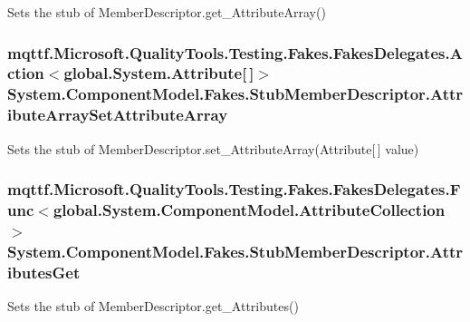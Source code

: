 Sets the stub of Member\-Descriptor.\-get\-\_\-\-Attribute\-Array()

\hypertarget{class_system_1_1_component_model_1_1_fakes_1_1_stub_member_descriptor_a898e120787eafb8d47519974dd9ed45d}{
\subsubsection[{Attribute\-Array\-Set\-Attribute\-Array}]{\setlength{\rightskip}{0pt plus 5cm}mqttf.\-Microsoft.\-Quality\-Tools.\-Testing.\-Fakes.\-Fakes\-Delegates.\-Action$<$global.\-System.\-Attribute\mbox{[}$\,$\mbox{]}$>$ System.\-Component\-Model.\-Fakes.\-Stub\-Member\-Descriptor.\-Attribute\-Array\-Set\-Attribute\-Array}}\label{class_system_1_1_component_model_1_1_fakes_1_1_stub_member_descriptor_a898e120787eafb8d47519974dd9ed45d}


Sets the stub of Member\-Descriptor.\-set\-\_\-\-Attribute\-Array(\-Attribute\mbox{[}$\,$\mbox{]} value)

\hypertarget{class_system_1_1_component_model_1_1_fakes_1_1_stub_member_descriptor_a0eed2477a38288ba95bb1611b3517108}{
\subsubsection[{Attributes\-Get}]{\setlength{\rightskip}{0pt plus 5cm}mqttf.\-Microsoft.\-Quality\-Tools.\-Testing.\-Fakes.\-Fakes\-Delegates.\-Func$<$global.\-System.\-Component\-Model.\-Attribute\-Collection$>$ System.\-Component\-Model.\-Fakes.\-Stub\-Member\-Descriptor.\-Attributes\-Get}}\label{class_system_1_1_component_model_1_1_fakes_1_1_stub_member_descriptor_a0eed2477a38288ba95bb1611b3517108}


Sets the stub of Member\-Descriptor.\-get\-\_\-\-Attributes()

